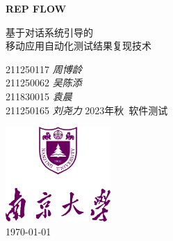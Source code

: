 \begin{titlepage}
    \begin{center}
        \vspace*{2.7cm}
            
        \Huge
        \textbf{R{\huge EP} F{\huge LOW}}
            
        \vspace{1cm}
        \huge
        基于对话系统引导的\\移动应用自动化测试结果复现技术
        \vspace{1.5cm}
        \Large
            
        {211250117 \textit{周博龄}\\
        211250062 \textit{吴陈添}\\
        211830015 \textit{袁\hspace{1em}晨}\\
        211250165 \textit{刘尧力}}
        \vfill
        2023年秋\ 软件测试
        \vspace{1cm}  
    
        \includegraphics[width=0.3\textwidth]{templates/img/logo-nju.png}\\
        \vspace{1cm}  
        \Large \today
        
    \end{center}
\end{titlepage}

